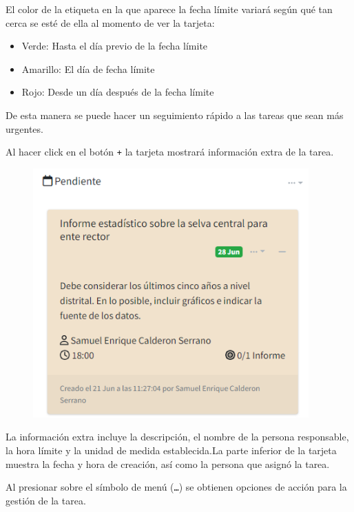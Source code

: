 \documentclass[
  letterpaper,
  DIV=11,
  numbers=noendperiod]{scrreprt}
\begin{document}
El color de la etiqueta en la que aparece la fecha límite variará según
qué tan cerca se esté de ella al momento de ver la tarjeta:

\begin{itemize}
\item
  Verde: Hasta el día previo de la fecha límite
\item
  Amarillo: El día de fecha límite
\item
  Rojo: Desde un día después de la fecha límite
\end{itemize}

De esta manera se puede hacer un seguimiento rápido a las tareas que
sean más urgentes.

Al hacer click en el botón \texttt{+} la tarjeta mostrará información
extra de la tarea.

\begin{figure}

{\centering \includegraphics[width=4.16667in,height=\textheight]{./img/manual-user/task-open.png}

}

\end{figure}

La información extra incluye la descripción, el nombre de la persona
responsable, la hora límite y la unidad de medida establecida.La parte
inferior de la tarjeta muestra la fecha y hora de creación, así como la
persona que asignó la tarea.

Al presionar sobre el símbolo de menú (\texttt{…}) se obtienen opciones
de acción para la gestión de la tarea.
\end{document}
